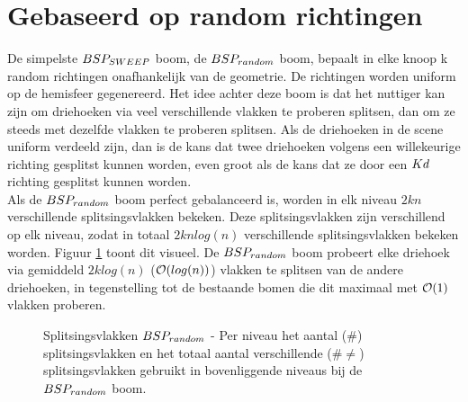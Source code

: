 \section{Gebaseerd op random richtingen}
De simpelste $BSP_{SWEEP}$ boom, de $\symBSPrandom$ boom, bepaalt in elke knoop k random richtingen onafhankelijk van de geometrie.
De richtingen worden uniform op de hemisfeer gegenereerd.
Het idee achter deze boom is dat het nuttiger kan zijn om driehoeken via veel verschillende vlakken te proberen splitsen, dan om ze steeds met dezelfde vlakken te proberen splitsen.
Als de driehoeken in de scene uniform verdeeld zijn, dan is de kans dat twee driehoeken volgens een willekeurige richting gesplitst kunnen worden, even groot als de kans dat ze door een $Kd$ richting gesplitst kunnen worden.\\

Als de $\symBSPrandom$ boom perfect gebalanceerd is, worden in elk niveau $2kn$ verschillende splitsingsvlakken bekeken.
Deze splitsingsvlakken zijn verschillend op elk niveau, zodat in totaal $2knlog(n)$ verschillende splitsingsvlakken bekeken worden.
Figuur \ref{fig:splitsingsvlakken-bsprandom} toont dit visueel.
De $\symBSPrandom$ boom probeert elke driehoek via gemiddeld $2klog(n)$ ($\mathcal{O}(log(n))$) vlakken te splitsen van de andere driehoeken, in tegenstelling tot de bestaande bomen die dit maximaal met $\mathcal{O}(1)$ vlakken proberen.\\

\begin{figure}
    \centering

   \caption[Splitsingsvlakken $\symBSPrandom$]%
    {Splitsingsvlakken $\symBSPrandom$ - \small Per niveau het aantal ($\#$) splitsingsvlakken en het totaal aantal verschillende ($\# \neq$) splitsingsvlakken gebruikt in bovenliggende niveaus bij de $\symBSPrandom$ boom.} %
    \label{fig:splitsingsvlakken-bsprandom}
\end{figure}

